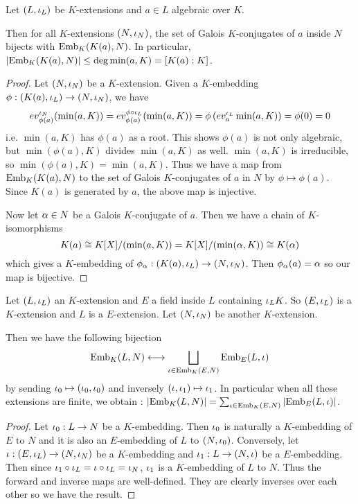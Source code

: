 \documentclass[main.tex]{subfiles}
\begin{document}
\begin{lem}  
  
  Let $(L,\iota_L)$ be $K$-extensions and 
  $a \in L$ algebraic over $K$. 

  Then for all $K$-extensions $(N,\iota_N)$, 
  the set of Galois $K$-conjugates of $a$ inside $N$ 
  bijects with $\mathrm{Emb}_{K}(K(a), N)$.
  In particular, $|\mathrm{Emb}_{K}(K(a), N)| \leq \deg \min(a,K) = [K(a) : K]$. 
\end{lem}
\begin{proof}
  Let $(N,\iota_N)$ be a $K$-extension. 
  Given a $K$-embedding $\phi : (K(a),\iota_L) \to (N,\iota_N)$, 
  we have \[ 
    ev_{\phi(a)}^{\iota_N} (\min(a,K)) 
    = ev_{\phi(a)}^{\phi \circ \iota_L} (\min(a,K))
    = \phi\left( ev_a^{\iota_L} \min(a,K) \right)
    = \phi(0) = 0
  \]
  i.e. $\min(a,K)$ has $\phi(a)$ as a root. 
  This shows $\phi(a)$ is not only algebraic, 
  but $\min(\phi(a),K)$ divides $\min(a,K)$ as well.
  $\min(a,K)$ is irreducible, so $\min(\phi(a),K) = \min(a,K)$. 
  Thus we have a map from $\mathrm{Emb}_{K}(K(a), N)$ to
  the set of Galois $K$-conjugates of $a$ in $N$ by $\phi \mapsto \phi(a)$. 
  Since $K(a)$ is generated by $a$, the above map is injective. 
  
  Now let $\alpha \in N$ be a Galois $K$-conjugate of $a$. 
  Then we have a chain of $K$-isomorphisms 
  \[ K(a) \cong K[X] / (\min(a,K)) 
  = K[X] / (\min(\alpha,K)) \cong K(\alpha) \]
  which gives a $K$-embedding of $\phi_\alpha : (K(a),\iota_L) \to (N,\iota_N)$. 
  Then $\phi_\alpha(a) = \alpha$ so our map is bijective. 
\end{proof}

\begin{lem} 
  
  Let $(L,\iota_L)$ an $K$-extension and 
  $E$ a field inside $L$ containing $\iota_L K$. 
  So $(E,\iota_L)$ is a $K$-extension and $L$ is a $E$-extension. 
  Let $(N,\iota_N)$ be another $K$-extension. 

  Then we have the following bijection \begin{align*}
    \mathrm{Emb}_{K}(L, N) \longleftrightarrow 
    \bigsqcup_{\iota \in \mathrm{Emb}_{K}(E, N)} \mathrm{Emb}_{E}(L, \iota)
  \end{align*}
  by sending $\iota_0 \mapsto (\iota_0,\iota_0)$ and inversely  
  $(\iota, \iota_1) \mapsto \iota_1$. 
  In particular when all these extensions are finite, 
  we obtain : 
  $|\mathrm{Emb}_{K}(L, N)| = \sum_{\iota \in \mathrm{Emb}_{K}(E, N)} |\mathrm{Emb}_{E}(L, \iota)|$.  
\end{lem}
\begin{proof}
  Let $\iota_0 : L \to N$ be a $K$-embedding. 
  Then $\iota_0$ is naturally a $K$-embedding of $E$ to $N$
  and it is also an $E$-embedding of $L$ to $(N,\iota_0)$.
  Conversely, let $\iota : (E,\iota_L) \to (N,\iota_N)$ be a $K$-embedding
  and $\iota_1 : L \to (N,\iota)$ be a $E$-embedding. 
  Then since $\iota_1 \circ \iota_L = \iota \circ \iota_L = \iota_N$, 
  $\iota_1$ is a $K$-embedding of $L$ to $N$. 
  Thus the forward and inverse maps are well-defined.
  They are clearly inverses over each other so we have the result. 
\end{proof}
\end{document}
